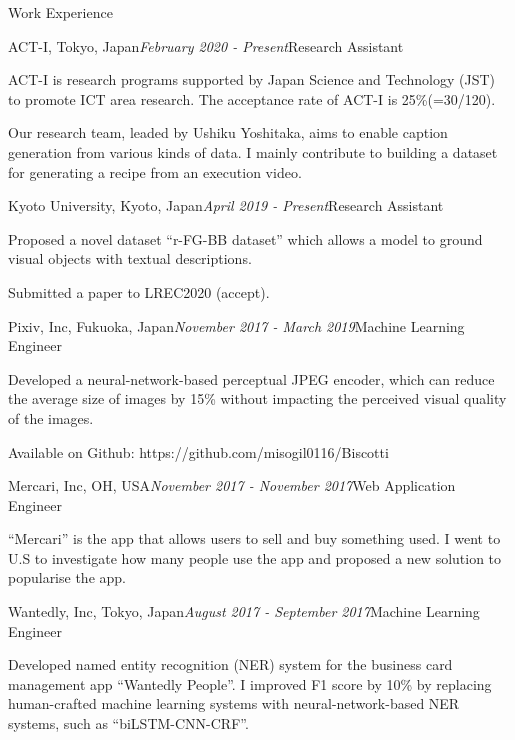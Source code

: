 \begin{rSection}{Work Experience}

\begin{rSubsection}{ACT-I, Tokyo, Japan}{\em February 2020 - Present}{Research Assistant}{}
\item ACT-I is research programs supported by Japan Science and Technology (JST) to promote ICT area research. The acceptance rate of ACT-I is 25\%(=30/120).
\item Our research team, leaded by Ushiku Yoshitaka, aims to enable caption generation from various kinds of data. I mainly contribute to building a dataset for generating a recipe from an execution video.
\end{rSubsection}

\begin{rSubsection}{Kyoto University, Kyoto, Japan}{\em April 2019 - Present}{Research Assistant}{}
\item Proposed a novel dataset ``r-FG-BB dataset'' which allows a model to ground visual objects with textual descriptions.
\item Submitted a paper to LREC2020 (accept).
\end{rSubsection}

\begin{rSubsection}{Pixiv, Inc, Fukuoka, Japan}{\em November 2017 - March 2019}{Machine Learning Engineer}{}
\item Developed a neural-network-based perceptual JPEG encoder, which can reduce the average size of images by 15\% without impacting the perceived visual quality of the images.
\item Available on Github: https://github.com/misogil0116/Biscotti
\end{rSubsection}

\begin{rSubsection}{Mercari, Inc, OH, USA}{\em November 2017 - November 2017}{Web Application Engineer}{}
\item ``Mercari'' is the app that allows users to sell and buy something used. I went to U.S to investigate how many people use the app and proposed a new solution to popularise the app.
\end{rSubsection}

\begin{rSubsection}{Wantedly, Inc, Tokyo, Japan}{\em August 2017 - September 2017}{Machine Learning Engineer}{}
\item Developed named entity recognition (NER) system for the business card management app ``Wantedly People''. I improved F1 score by 10\% by replacing human-crafted machine learning systems with neural-network-based NER systems, such as ``biLSTM-CNN-CRF''.
\end{rSubsection}

\end{rSection}